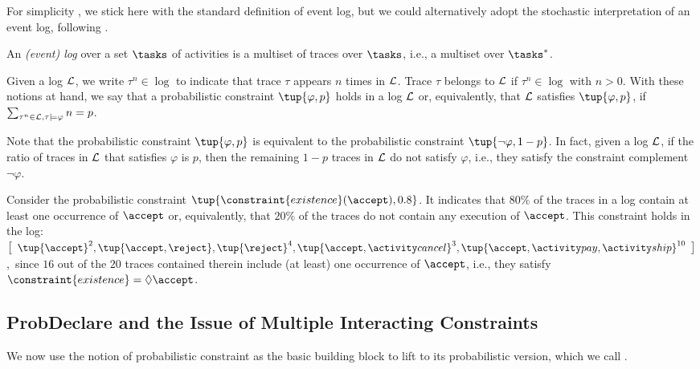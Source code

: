 For simplicity , we stick here with the standard definition of event log, but we could alternatively adopt the stochastic interpretation of an event log, following  \cite{DBLP:conf/bpm/LeemansSA19}.

\begin{definition}
  An \emph{(event) log} over a set $\tasks$ of activities is a multiset of traces over $\tasks$, i.e., a multiset over $\tasks^*$.
\end{definition}
Given a log $\mathcal{L}$, we write $\tau^n \in \log$ to indicate that trace $\tau$ appears $n$ times in $\mathcal{L}$. Trace $\tau$ belongs to $\mathcal{L}$ if $\tau^n \in \log$ with $n > 0$. With these notions at hand, we say that a probabilistic constraint $\tup{\varphi,p}$ holds in a log $\mathcal{L}$ or, equivalently, that $\mathcal{L}$ satisfies $\tup{\varphi,p}$, if $\sum_{\tau^n \in \mathcal{L}, \tau \models \varphi} n = p$.

Note that the probabilistic constraint $\tup{\varphi,p}$ is equivalent to the probabilistic constraint $\tup{\neg \varphi,1-p}$. In fact, given a log $\mathcal{L}$, if the ratio of traces in $\mathcal{L}$ that satisfies $\varphi$ is $p$, then the remaining $1-p$ traces in $\mathcal{L}$ do not satisfy $\varphi$, i.e., they satisfy the constraint complement $\neg \varphi$.

\begin{example}
  Consider the probabilistic constraint $\tup{\constraint{existence}(\accept),0.8}$. It indicates that $80\%$ of the traces in a log contain at least one occurrence of $\accept$ or, equivalently, that $20\%$ of the traces do not contain any execution of $\accept$. This constraint holds in the log:
  $
    \left[
      \begin{array}{l}
        \tup{\accept}^2,
        \tup{\accept,\reject},
        \tup{\reject}^4,
        \tup{\accept,\cancel}^3,
        \tup{\accept,\pay,\ship}^{10}
      \end{array}
    \right]$,~since $16$ out of the $20$ traces contained therein include (at least) one occurrence of $\accept$, i.e., they satisfy $\constraint{existence} = \Diamond \accept$.
\end{example}

\subsection{ProbDeclare and the Issue of Multiple Interacting Constraints}
We now use the notion of probabilistic constraint as the basic building block to lift \declare to its probabilistic version, which we call \pdeclare.

